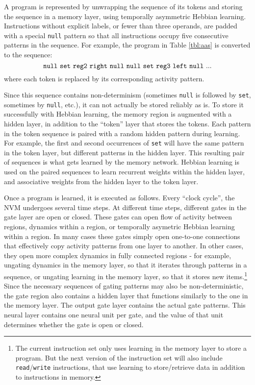 \documentclass[pdftex,12pt,letterpaper]{article}
\begin{document}
A program is represented by unwrapping the sequence of its tokens and storing the sequence in a memory layer, using temporally asymmetric Hebbian learning.  Instructions without explicit labels, or fewer than three operands, are padded with a special \texttt{null} pattern so that all instructions occupy five consecutive patterns in the sequence.  For example, the program in Table \ref{tbl:aas} is converted to the sequence:
\[ \text{\texttt{null} \texttt{set} \texttt{reg2} \texttt{right} \texttt{null} \texttt{null} \texttt{set} \texttt{reg3} \texttt{left} \texttt{null} ...} \]
where each token is replaced by its corresponding activity pattern.

Since this sequence contains non-determinism (sometimes \texttt{null} is followed by \texttt{set}, sometimes by \texttt{null}, etc.), it can not actually be stored reliably as is.  To store it successfully with Hebbian learning, the memory region is augmented with a hidden layer, in addition to the ``token'' layer that stores the tokens.  Each pattern in the token sequence is paired with a random hidden pattern during learning.  For example, the first and second occurrences of \texttt{set} will have the same pattern in the token layer, but different patterns in the hidden layer.  This resulting pair of sequences is what gets learned by the memory network.  Hebbian learning is used on the paired sequences to learn recurrent weights within the hidden layer, and associative weights from the hidden layer to the token layer.

Once a program is learned, it is executed as follows.  Every ``clock cycle'', the NVM undergoes several time steps.  At different time steps, different gates in the gate layer are open or closed.  These gates can open flow of activity between regions, dynamics within a region, or temporally asymetric Hebbian learning within a region.  In many cases these gates simply open one-to-one connections that effectively copy activity patterns from one layer to another.  In other cases, they open more complex dynamics in fully connected regions - for example, ungating dynamics in the memory layer, so that it iterates through patterns in a sequence, or ungating learning in the memory layer, so that it stores new items.\footnote{The current instruction set only uses learning in the memory layer to store a program.  But the next version of the instruction set will also include \texttt{read}/\texttt{write} instructions, that use learning to store/retrieve data in addition to instructions in memory.}  Since the necessary sequences of gating patterns may also be non-deterministic, the gate region also contains a hidden layer that functions similarly to the one in the memory layer.  The output gate layer contains the actual gate patterns.  This neural layer contains one neural unit per gate, and the value of that unit determines whether the gate is open or closed.
\end{document}

